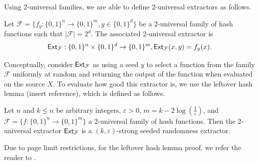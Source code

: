 Using 2-universal families, we are able to define 2-universal extractors as follows.
\begin{definition}
    Let $\mathcal{F} = \{f_y:\{0,1\}^n \rightarrow \{0,1\}^m, y \in \{0,1\}^d\}$ be a 2-universal family of hash functions such that $|\mathcal{F}| = 2^d$. The associated 2-universal extractor is 
    \[
        \mathsf{Ext}_{\mathcal{F}}:\{0,1\}^n \times \{0,1\}^d \rightarrow \{0,1\}^m, \mathsf{Ext}_{\mathcal{F}}(x,y) = f_y(x).
    \]
\end{definition}
Conceptually, consider $\mathsf{Ext}_{\mathcal{F}}$ as using a seed $y$ to select a function from the family $\mathcal{F}$ uniformly at random and returning the output of the function when evaluated on the source $X$. To evaluate how good this extractor is, we use the leftover hash lemma (insert reference), which is defined as follows.
\begin{definition}
    Let $n$ and $k \leq n$ be arbitrary integers, $\varepsilon > 0$, $m = k - 2\log(\frac{1}{\varepsilon})$, and $\mathcal{F} = \{f: \{0,1\}^n \rightarrow \{0,1\}^m\}$ a 2-universal family of hash functions. Then the 2-universal extractor $\mathsf{Ext}_{\mathcal{F}}$ is a $(k,\varepsilon)$-strong seeded randomness extractor.
\end{definition}
Due to page limit restrictions, for the leftover hash lemma proof, we refer the reader to \cite{tudelftQC}.


